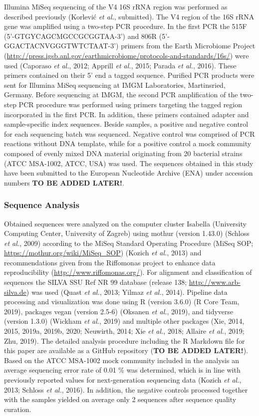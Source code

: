\documentclass[12pt,]{article}
\begin{document}
Illumina MiSeq sequencing of the V4 16S rRNA region was performed as
described previously (Korlević \emph{et al.}, submitted). The V4 region
of the 16S rRNA gene was amplified using a two-step PCR procedure. In
the first PCR the 515F (5'-GTGYCAGCMGCCGCGGTAA-3') and 806R
(5'-GGACTACNVGGGTWTCTAAT-3') primers from the Earth Microbiome Project
(\url{http://press.igsb.anl.gov/earthmicrobiome/protocols-and-standards/16s/})
were used (Caporaso \emph{et al.}, 2012; Apprill \emph{et al.}, 2015;
Parada \emph{et al.}, 2016). These primers contained on their 5' end a
tagged sequence. Purified PCR products were sent for Illumina MiSeq
sequencing at IMGM Laboratories, Martinsried, Germany. Before sequencing
at IMGM, the second PCR amplification of the two-step PCR procedure was
performed using primers targeting the tagged region incorporated in the
first PCR. In addition, these primers contained adapter and
sample-specific index sequences. Beside samples, a positive and negative
control for each sequencing batch was sequenced. Negative control was
comprised of PCR reactions without DNA template, while for a positive
control a mock community composed of evenly mixed DNA material
originating from 20 bacterial strains (ATCC MSA-1002, ATCC, USA) was
used. The sequences obtained in this study have been submitted to the
European Nucleotide Archive (ENA) under accession numbers \textbf{TO BE
ADDED LATER!}.

\hypertarget{sequence-analysis}{%
\subsubsection{Sequence Analysis}\label{sequence-analysis}}

Obtained sequences were analyzed on the computer cluster Isabella
(University Computing Center, University of Zagreb) using mothur
(version 1.43.0) (Schloss \emph{et al.}, 2009) according to the MiSeq
Standard Operating Procedure (MiSeq SOP;
\url{https://mothur.org/wiki/MiSeq_SOP}) (Kozich \emph{et al.}, 2013)
and recommendations given from the Riffomonas project to enhance data
reproducibility (\url{http://www.riffomonas.org/}). For alignment and
classification of sequences the SILVA SSU Ref NR 99 database (release
138; \url{http://www.arb-silva.de}) was used (Quast \emph{et al.}, 2013;
Yilmaz \emph{et al.}, 2014). Pipeline data processing and visualization
was done using R (version 3.6.0) (R Core Team, 2019), packages vegan
(version 2.5-6) (Oksanen \emph{et al.}, 2019), and tidyverse (version
1.3.0) (Wickham \emph{et al.}, 2019) and multiple other packages (Xie,
2014, 2015, 2019a, 2019b, 2020; Neuwirth, 2014; Xie \emph{et al.}, 2018;
Allaire \emph{et al.}, 2019; Zhu, 2019). The detailed analysis procedure
including the R Markdown file for this paper are available as a GitHub
repository (\textbf{TO BE ADDED LATER!}). Based on the ATCC MSA-1002
mock community included in the analysis an average sequencing error rate
of 0.01 \si{\percent} was determined, which is in line with previously
reported values for next-generation sequencing data (Kozich \emph{et
al.}, 2013; Schloss \emph{et al.}, 2016). In addition, the negative
controls processed together with the samples yielded on average only 2
sequences after sequence quality curation.
\end{document}
